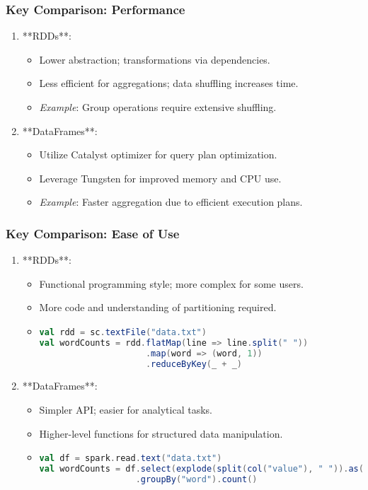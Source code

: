 \documentclass[aspectratio=169]{beamer}
\begin{document}
\begin{frame}
    \frametitle{Key Comparison: Performance}
    \begin{enumerate}
        \item **RDDs**:
            \begin{itemize}
                \item Lower abstraction; transformations via dependencies.
                \item Less efficient for aggregations; data shuffling increases time.
                \item \textit{Example}: Group operations require extensive shuffling.
            \end{itemize}
        \item **DataFrames**:
            \begin{itemize}
                \item Utilize Catalyst optimizer for query plan optimization.
                \item Leverage Tungsten for improved memory and CPU use.
                \item \textit{Example}: Faster aggregation due to efficient execution plans.
            \end{itemize}
    \end{enumerate}
\end{frame}

\begin{frame}[fragile]
    \frametitle{Key Comparison: Ease of Use}
    \begin{enumerate}
        \item **RDDs**:
            \begin{itemize}
                \item Functional programming style; more complex for some users.
                \item More code and understanding of partitioning required.
                \item \begin{lstlisting}[language=Scala]
val rdd = sc.textFile("data.txt")
val wordCounts = rdd.flatMap(line => line.split(" "))
                     .map(word => (word, 1))
                     .reduceByKey(_ + _)
                \end{lstlisting}
            \end{itemize}
        \item **DataFrames**:
            \begin{itemize}
                \item Simpler API; easier for analytical tasks.
                \item Higher-level functions for structured data manipulation.
                \item \begin{lstlisting}[language=Scala]
val df = spark.read.text("data.txt")
val wordCounts = df.select(explode(split(col("value"), " ")).as("word"))
                   .groupBy("word").count()
                \end{lstlisting}
            \end{itemize}
    \end{enumerate}
\end{frame}
\end{document}
